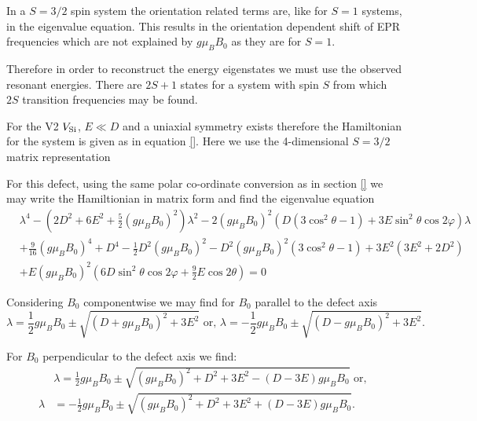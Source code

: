 In a $S=3/2$ spin system the orientation related terms are, like for $S=1$ systems, in the eigenvalue equation. 
This results in the orientation dependent shift of EPR frequencies which are not explained by $g \mu_B B_0$ as they are for $S=1$. 

Therefore in order to reconstruct the energy eigenstates we must use the observed resonant energies. There are $2S +1 $ states for a system with spin $S$ from which $2S$ transition frequencies may be found. 



For the V2 $V_{\ce{Si}}$, $E \ll D$ and a uniaxial symmetry exists therefore the Hamiltonian for the system is given as in equation \ref{}. Here we use the 4-dimensional $S=3/2$ matrix representation 
\begin{equation}
    \label{eq:}
\end{equation}

    For this defect, using the same polar co-ordinate conversion as in section \ref{} we may write the Hamiltionian in matrix form  and find the eigenvalue equation 
\begin{equation}
    \begin{align}
    &\lambda^4 - \left(2D^2 + 6E^2  + \frac{5}{2}(g\mu_B B_0)^2 \right)\lambda^2 - 2 (g \mu_B B_0)^2 \left(D(3 \cos^2 \theta -1) + 3E \sin^2\theta \cos 2\varphi \right)\lambda \\ 
    &+\frac{9}{16}(g \mu_B B_0)^4 + D^4 - \frac{1}{2}D^2 (g \mu_B B_0)^2 - D^2 (g \mu_B B_0)^2 (3 \cos^2 \theta - 1) + 3E^2(3E^2 + 2D^2) \\ 
    &+ E(g\mu_BB_0)^2 (6D \sin^2\theta \cos 2\varphi + \frac{9}{2}E \cos2\theta) = 0 
    \end{align} 
    \label{eq:V2_eigenvalue_equation}
\end{equation}
 
Considering $B_0$ componentwise we may find \cite{Kirmse1995} for $B_0$ parallel to the defect axis 
\begin{equation}
\lambda = \frac{1}{2}g\mu_B B_0 \pm \sqrt{(D + g\mu_B B_0)^2 + 3E^2} 
   \text{ or, }
   \lambda = -\frac{1}{2} g\mu_B B_0 \pm \sqrt{(D-g\mu_B B_0)^2 + 3E^2}.
\end{equation}

For $B_0$ perpendicular to the defect axis we find:
\begin{equation}
    \begin{align}
        &\lambda = \frac{1}{2}g\mu_B B_0 \pm \sqrt{(g\mu_B B_0)^2 + D^2  + 3E^2 - (D - 3E)g\mu_B B_0}\text{ or, }\\
        \lambda &= -\frac{1}{2}g\mu_B B_0 \pm \sqrt{(g\mu_B B_0)^2 + D^2 + 3E^2 + (D-3E)g\mu_B B_0}.
    \end{align}
\end{equation}

